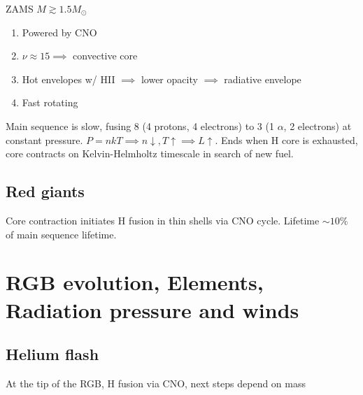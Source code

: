 \documentclass{article}
\begin{document}
ZAMS $M \gtrsim 1.5M_\odot$

\begin{enumerate}
    \item Powered by CNO
    \item $\nu \approx 15 \implies$  convective core
    \item Hot envelopes w/ HII $\implies$ lower opacity $\implies$ radiative envelope
    \item Fast rotating
\end{enumerate}

Main sequence is slow, fusing 8 (4 protons, 4 electrons) to 3 (1 $\alpha$, 2 electrons) at constant pressure. $P = nkT \implies n \downarrow, T\uparrow \implies L \uparrow$. Ends when H core is exhausted, core contracts on Kelvin-Helmholtz timescale in search of new fuel.

\subsection{Red giants}

Core contraction initiates H fusion in thin shells via CNO cycle. Lifetime $\sim 10\%$ of main sequence lifetime.

\section{RGB evolution, Elements, Radiation pressure and winds}

\subsection{Helium flash}

At the tip of the RGB, H fusion via CNO, next steps depend on mass
\end{document}
